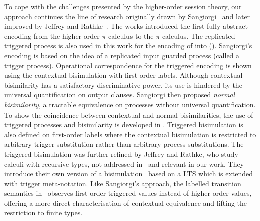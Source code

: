 To cope with the challenges presented by the higher-order
session theory, 
our approach continues the line of research 
originally drawn by Sangiorgi~\cite{San96H,SangiorgiD:expmpa}
and later improved by Jeffrey and Rathke~\cite{DBLP:journals/lmcs/JeffreyR05}.
The works %
\cite{San96H,SangiorgiD:expmpa}
introduced the first fully abstract encoding from the higher-order 
$\pi$-calculus to the $\pi$-calculus. 
The replicated triggered process 
is also used in this work for the encoding of \HOp into \sessp ().
Sangiorgi's encoding is based on the idea of a replicated input guarded process 
(called a trigger process). Operational correspondence for
the triggered encoding is shown using the contextual bisimulation
with first-order labels.
Although contextual bisimilarity has a satisfactory discriminative power,
its use is hindered by the universal quantification on output clauses.
Sangiorgi then proposed \emph{normal bisimilarity}, a tractable  equivalence 
on processes without universal quantification. 
To show the coincidence between contextual and normal bisimilarities, 
the use of triggered processes and bisimilarity is developed in \cite{San96H}.
Triggered bisimulation is also defined on first-order labels
where the contextual bisimulation is restricted to arbitrary
trigger substitution rather than arbitrary process substitutions.
The triggered bisimulation was further refined by Jeffrey and
Rathke, who study calculi with recursive types, not addressed in~\cite{San96H,SangiorgiD:expmpa} and
relevant in our work.
They introduce their own version of a
bisimulation~\cite{DBLP:journals/lmcs/JeffreyR05}
based on a LTS which is extended with trigger meta-notation.
Like Sangiorgi's approach, the labelled transition semantics
in~\cite{DBLP:journals/lmcs/JeffreyR05}
observes first-order triggered values instead of
higher-order values, offering a more direct characterisation of contextual equivalence
and lifting the restriction to finite types.


